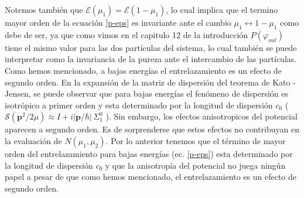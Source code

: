 \documentclass[12pt]{book}
\numberwithin{equation}{chapter}
\def\S{\mathcal{S}}
\def\E{\mathcal{E}}
\def\vp{\varphi}
\def\P{\mathbf{p}}
\begin{document}
Notemos tambi\'en que $\E(\mu_{1})=\E(1-\mu_{1})$, lo cual implica que el termino mayor orden de la ecuaci\'on \eqref{p-eps} es invariante ante el cambio $\mu_{1} \leftrightarrow 1-\mu_{1}$ como debe de ser, ya que como vimos en el capitulo 12 de la introducci\'on $P(\vp_{out})$ tiene el mismo valor para las dos part\'iculas del sistema, lo cual tambi\'en se puede interpretar como la invariancia de la pureza ante el intercambio de las part\'iculas.\\

Como hemos mencionado, a bajas energ\'ias el entrelazamiento es un efecto de segundo orden. En la expansi\'on de la matriz de dispersi\'on del teorema de Kato - Jensen, se puede observar que para bajas energ\'ias el fen\'omeno de dispersi\'on es isotr\'opico a primer orden y esta determinado por la longitud de dispersi\'on $c_{0}$ ( $\S(\P^{2}/2\mu) \approx I + i |\P/\hbar| \, \Sigma_{1}^{0}$ ). Sin embargo, los efectos anisotropicos del potencial aparecen a segundo orden. Es de sorprenderse que estos efectos no contribuyan en la evaluaci\'on de $N(\mu_{1},\mu_{2})$. Por lo anterior tenemos que el t\'ermino de mayor orden del entrelazamiento para bajas energ\'ias (ec. \eqref{p-eps}) esta determinado por la longitud de dispersi\'on $c_{0}$ y que la anisotrop\'ia del potencial no juega ning\'un papel a pesar de que como hemos mencionado, el entrelazamiento es un efecto de segundo orden.\\
\end{document}

